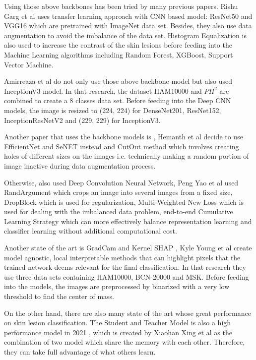 \documentclass[sensors,article,submit,pdftex,moreauthors]{Definitions/mdpi}
\begin{document}
Using those above backbones has been tried by many previous papers. Rishu Garg et al   \cite{03798} uses transfer learning approach with CNN based model: ResNet50 and VGG16 which are pretrained with ImageNet data set. Besides, they also use data augmentation to avoid the imbalance of the data set. Histogram Equalization is also used to increase the contrast of the skin lesions before feeding into the Machine Learning algorithms including Random Forest, XGBoost, Support Vector Machine.	

Amirreaza et al \cite{10348} do not only use those above backbone model but also used InceptionV3 \cite{00567} model. In that research, the dataset HAM10000 and $PH^2$ are combined to create a 8 classes data set. Before feeding into the Deep CNN models, the image is resized to (224, 224) for DenseNet201, ResNet152, InceptionResNetV2 and (229, 229) for InceptionV3. 

Another paper that uses the backbone models is \cite{09418}, Hemanth et al decide to use EfficientNet \cite{11946} and SeNET \cite{01507} instead and CutOut \cite{04552v2} method which involves creating holes of different sizes on the images i.e. technically making a random portion of image inactive during data augmentation process. 

Otherwise, \cite{01284} also used Deep Convolution Neural Network, Peng Yao et al used RandArgument which crops an image into several images from a fixed size, DropBlock which is used for regularization, Multi-Weighted New Loss which is used for dealing with the imbalanced data problem, end-to-end Cumulative Learning Strategy which can more effectively balance representation learning and classifier learning without additional computational cost. 

Another state of the art is GradCam and Kernel SHAP \cite{06612}, Kyle Young et al create model agnostic, local interpretable methods that can highlight pixels that the trained network deems relevant for the final classification. In that research they use three data sets containing HAM10000, BCN-20000 and MSK. Before feeding into the models, the images are preprocessed by binarized with a very low threshold to find the center of mass. 

On the other hand, there are also many state of the art whose great performance on skin lesion classification. The Student and Teacher Model is also a high performance model in 2021 \cite{03225}, which is created by Xiaohan Xing et al as the combination of two model which share the memory with each other. Therefore, they can take full advantage of what others learn. 
\end{document}
